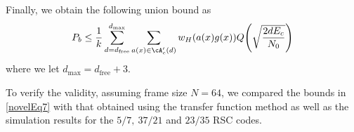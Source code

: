 
Finally, we obtain the following union bound as
\begin{align}
P_b \leq \frac{1}{k} \sum_{d=d_{\text{free}}}^{d_{\text{max}}} \sum_{a(x) \in \cA'_c(d)}w_H(a(x)g(x)) Q\Bigg( \sqrt{\frac{2dE_c}{N_0}}\Bigg)
\label{novelEq7}
\end{align}
where we let $d_{\text{max}}=d_{\text{free}}+3$. 

To verify the validity, assuming frame size $N=64$, we compared the bounds in \eqref{novelEq7} with that obtained using the transfer function method as well as the simulation results for the $5/7,~37/21$ and $23/35$ RSC codes.

